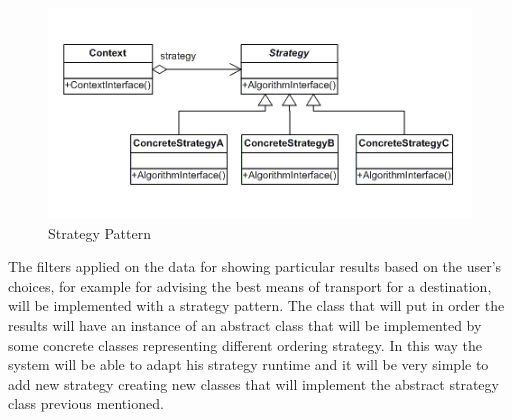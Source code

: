 \begin{figure}[H]
	\centering
	\includegraphics[scale=0.7]{Images/Patterns/Strategy_Pattern}
	\caption{Strategy Pattern}
\end{figure}
The filters applied on the data for showing particular results based on the user’s choices, for example for advising the best means of transport for a destination, will be implemented with a strategy pattern. The class that will put in order the results will have an instance of an abstract class that will be implemented by some concrete classes representing different ordering strategy. In this way the system will be able to adapt his strategy runtime and it will be very simple to add new strategy creating new classes that will implement the abstract strategy class previous mentioned.

